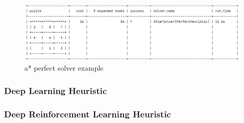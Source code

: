 \begin{figure}[H]
\centering
\includegraphics[scale=0.5]{./Figures/exampleastarperfectsolver}
\caption[Examples]{a* perfect solver example}
\label{fig:exampleastarperfectsolver}
\end{figure}



\subsubsection{Deep Learning Heuristic}
\subsubsection{Deep Reinforcement Learning Heuristic}


